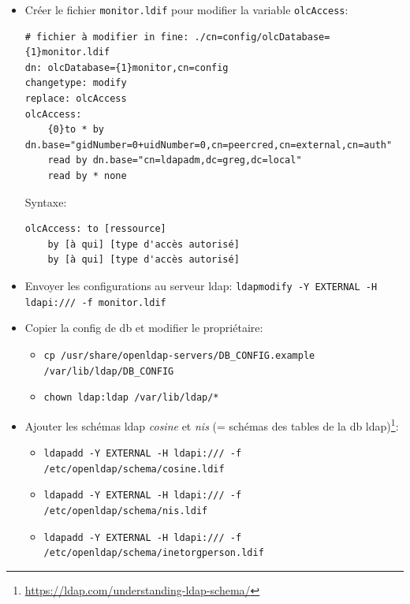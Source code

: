 \documentclass[a4paper]{article}
\begin{document}
\begin{itemize}
\item Créer le fichier \texttt{monitor.ldif} pour modifier la variable \texttt{olcAccess}:
\begin{example} \begin{verbatim}
# fichier à modifier in fine: ./cn=config/olcDatabase={1}monitor.ldif
dn: olcDatabase={1}monitor,cn=config
changetype: modify
replace: olcAccess
olcAccess:
    {0}to * by dn.base="gidNumber=0+uidNumber=0,cn=peercred,cn=external,cn=auth"
    read by dn.base="cn=ldapadm,dc=greg,dc=local"
    read by * none
\end{verbatim} \end{example}
Syntaxe:
\begin{example} \begin{verbatim}
olcAccess: to [ressource]
    by [à qui] [type d'accès autorisé]
    by [à qui] [type d'accès autorisé]
\end{verbatim} \end{example}


\item Envoyer les configurations au serveur ldap: \texttt{ldapmodify -Y EXTERNAL  -H ldapi:/// -f monitor.ldif}


\item Copier la config de db et modifier le propriétaire:
\begin{example} \begin{itemize}
    \item \texttt{cp /usr/share/openldap-servers/DB\_CONFIG.example /var/lib/ldap/DB\_CONFIG}
    \item \texttt{chown ldap:ldap /var/lib/ldap/*}
\end{itemize} \end{example}


\item Ajouter les schémas ldap \textit{cosine} et \textit{nis} (= schémas des tables de la db ldap)\footnote{\url{https://ldap.com/understanding-ldap-schema/}}:
\begin{example} \begin{itemize}
    \item \texttt{ldapadd -Y EXTERNAL -H ldapi:/// -f /etc/openldap/schema/cosine.ldif}
    \item \texttt{ldapadd -Y EXTERNAL -H ldapi:/// -f /etc/openldap/schema/nis.ldif}
    \item \texttt{ldapadd -Y EXTERNAL -H ldapi:/// -f /etc/openldap/schema/inetorgperson.ldif}
\end{itemize} \end{example}



\end{itemize}
\end{document}

